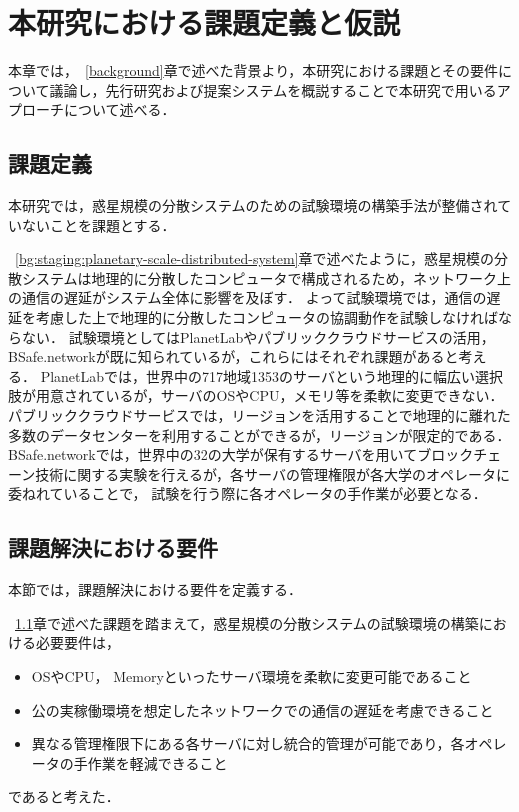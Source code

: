 \chapter{本研究における課題定義と仮説}
\label{issue}

本章では，~\ref{background}章で述べた背景より，本研究における課題とその要件について議論し，先行研究および提案システムを概説することで本研究で用いるアプローチについて述べる．

\section{課題定義}
\label{issue:definition}

本研究では，惑星規模の分散システムのための試験環境の構築手法が整備されていないことを課題とする．

~\ref{bg:staging:planetary-scale-distributed-system}章で述べたように，惑星規模の分散システムは地理的に分散したコンピュータで構成されるため，ネットワーク上の通信の遅延がシステム全体に影響を及ぼす．
よって試験環境では，通信の遅延を考慮した上で地理的に分散したコンピュータの協調動作を試験しなければならない．
試験環境としてはPlanetLabやパブリッククラウドサービスの活用，BSafe.networkが既に知られているが，これらにはそれぞれ課題があると考える．
PlanetLabでは，世界中の717地域1353のサーバという地理的に幅広い選択肢が用意されているが，サーバのOSやCPU，メモリ等を柔軟に変更できない．
パブリッククラウドサービスでは，リージョンを活用することで地理的に離れた多数のデータセンターを利用することができるが，リージョンが限定的である．
BSafe.networkでは，世界中の32の大学が保有するサーバを用いてブロックチェーン技術に関する実験を行えるが，各サーバの管理権限が各大学のオペレータに委ねれていることで，
試験を行う際に各オペレータの手作業が必要となる．

\section{課題解決における要件}
\label{issue:requirements}

本節では，課題解決における要件を定義する．

~\ref{issue:definition}章で述べた課題を踏まえて，惑星規模の分散システムの試験環境の構築における必要要件は，
\begin{itemize}
  \item OSやCPU， Memoryといったサーバ環境を柔軟に変更可能であること
  \item 公の実稼働環境を想定したネットワークでの通信の遅延を考慮できること
  \item 異なる管理権限下にある各サーバに対し統合的管理が可能であり，各オペレータの手作業を軽減できること
\end{itemize}
であると考えた．

